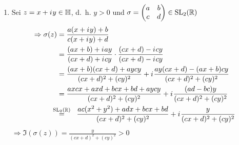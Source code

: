\begin{beweis}\leavevmode
    \begin{enumerate}[label=\alph*)]
        \item Sei $z = x + {i\mkern1mu} y \in \mathbb{H}$, d.~h. $y>0$ und
              $\sigma=\begin{pmatrix}a&b\\c&d\end{pmatrix} \in \mathrm{SL}_2(\mathbb{R})$
              \begin{align*}
                \Rightarrow \sigma(z) &= \frac{a(x + \iu y) + b}{c(x + \iu y) +d}\\
                &= \frac{(ax + b) + \iu ay}{(cx + d) + \iu cy} \cdot \frac{(cx+d)-\iu cy}{(cx+d)-\iu cy}\\
                &=   \frac{(ax+b)(cx+d) + aycy}{(cx+d)^2 + (cy)^2} + \iu \frac{ay(cx + d) - (ax+b)cy}{(cx+d)^2 + (cy)^2}\\
                &= \frac{axcx+axd+bcx+bd+aycy}{(cx+d)^2 + (cy)^2} + \iu \frac{(ad-bc)y}{(cx+d)^2 + (cy)^2}\\
                &\overset{\mathclap{\SL_2(\mdr)}}{=}\hspace{5 mm} \frac{ac(x^2+y^2)+adx+bcx+bd}{(cx+d)^2 + (cy)^2} + \iu \frac{y}{(cx+d)^2 + (cy)^2}
              \end{align*}
              $\Rightarrow \Im(\sigma(z)) = \frac{y}{(cx+d)^2 + (cy)^2} > 0$


\end{enumerate}
\end{beweis}
